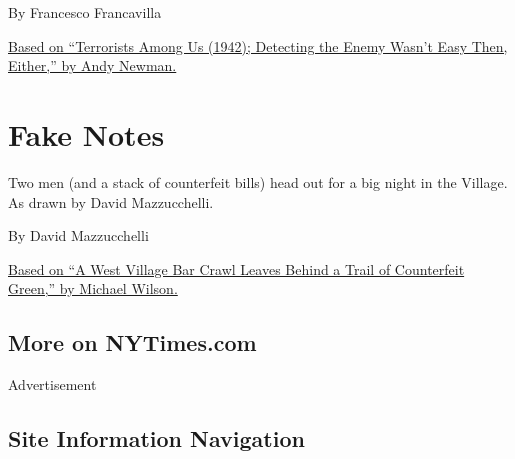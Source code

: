 By Francesco Francavilla

\href{http://www.nytimes3xbfgragh.onion/2002/01/17/nyregion/terrorists-among-us-1942-detecting-the-enemy-wasn-t-easy-then-either.html}{Based
on ``Terrorists Among Us (1942); Detecting the Enemy Wasn't Easy Then,
Either,'' by Andy Newman.}

\hypertarget{fake-notes}{%
\section{Fake Notes}\label{fake-notes}}

Two men (and a stack of counterfeit bills) head out for a big night in
the Village. As drawn by David Mazzucchelli.

By David Mazzucchelli

\href{https://www.nytimes3xbfgragh.onion/2015/03/28/nyregion/a-west-village-bar-crawl-leaves-behind-a-trail-of-counterfeit-green.html}{Based
on ``A West Village Bar Crawl Leaves Behind a Trail of Counterfeit
Green,'' by Michael Wilson.}

\hypertarget{more-on-nytimescom}{%
\subsection{More on NYTimes.com}\label{more-on-nytimescom}}

Advertisement

\hypertarget{site-information-navigation}{%
\subsection{Site Information
Navigation}\label{site-information-navigation}}

